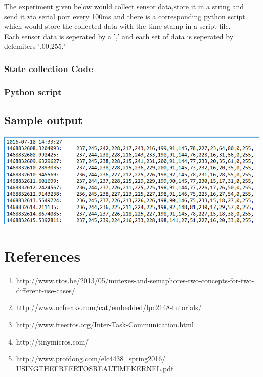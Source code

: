 \documentclass[11pt,a4paper]{article}
\begin{document}
	The experiment given below would collect sensor data,store it in a string and send it via serial port every 100ms and there is a corresponding python script which would store the collected data with the time stamp in a script file.
	\\
	Each sensor data is seperated by a ',' and each set of data is seperated by delemiters ',00,255,'
	\subsubsection{State collection Code}
	
	\newpage 
	\subsubsection{Python script}
	
	
	\subsection{Sample output}
	\includegraphics[width=14cm]{serialcomm}
	
	\newpage
	\section{References}
	\begin{enumerate}
	\item  http://www.rtos.be/2013/05/mutexes-and-semaphores-two-concepts-for-two-different-use-cases/
	
	\item http://www.ocfreaks.com/cat/embedded/lpc2148-tutorials/
	\item http://www.freertos.org/Inter-Task-Communication.html
	\item http://tinymicros.com/
	\item http://www.profdong.com/elc4438\_spring2016/\\USINGTHEFREERTOSREALTIMEKERNEL.pdf
	\end{enumerate}	
	
\end{document}
